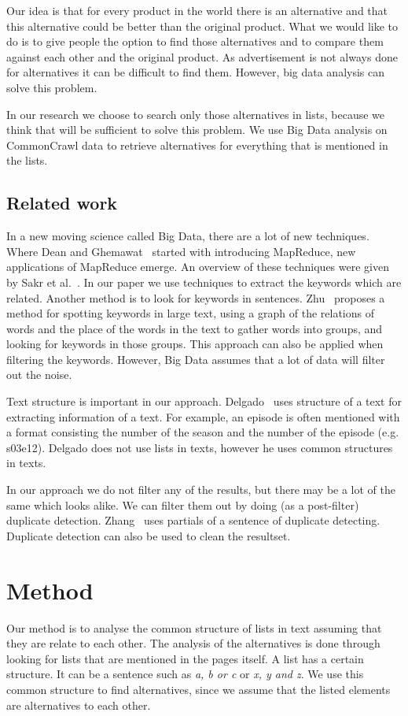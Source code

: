 \documentclass{sig-alternate}
\begin{document}
Our idea is that for every product in the world there is an alternative and that this alternative could be better than the original product. What we would like to do is to give people the option to find those alternatives and to compare them against each other and the original product. As advertisement is not always done for alternatives it can be difficult to find them. However, big data analysis can solve this problem.

In our research we choose to search only those alternatives in lists, because we think that will be sufficient to solve this problem. We use Big Data analysis on CommonCrawl data to retrieve alternatives for everything that is mentioned in the lists.

\subsection{Related work}
In a new moving science called Big Data, there are a lot of new techniques. Where Dean and Ghemawat~\cite{dean2008mapreduce} started with introducing MapReduce, new applications of MapReduce emerge. An overview of these techniques were given by Sakr et al.~\cite{sakr2013family}. In our paper we use techniques to extract the keywords which are related. Another method is to look for keywords in sentences. Zhu~\cite{Zhu2012} proposes a method for spotting keywords in large text, using a graph of the relations of words and the place of the words in the text to gather words into groups, and looking for keywords in those groups. This approach can also be applied when filtering the keywords. However, Big Data assumes that a lot of data will filter out the noise. 

Text structure is important in our approach. Delgado~\cite{delgado2002mining} uses structure of a text for extracting information of a text. For example, an episode is often mentioned with a format consisting the number of the season and the number of the episode (e.g. s03e12). Delgado does not use lists in texts, however he uses common structures in texts. 

In our approach we do not filter any of the results, but there may be a lot of the same which looks alike. We can filter them out by doing (as a post-filter) duplicate detection. Zhang~\cite{zhang2010efficient} uses partials of a sentence of duplicate detecting. Duplicate detection can also be used to clean the resultset.

\section{Method}
Our method is to analyse the common structure of lists in text assuming that they are relate to each other. The analysis of the alternatives is done through looking for lists that are mentioned in the pages itself. A list has a certain structure. It can be a sentence such as \emph{a, b or c} or \emph{x, y and z}. We use this common structure to find alternatives, since we assume that the listed elements are alternatives to each other.
\end{document}
